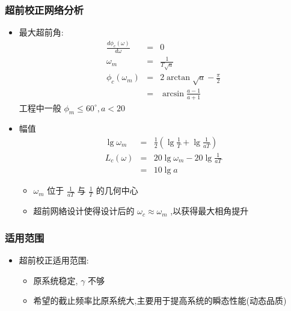 \documentclass[table]{beamer}
\begin{document}
\begin{frame}
\begin{itemize}

\end{itemize} %
\end{frame}
\begin{frame}
\frametitle{超前校正网络分析}
\label{sec-2-1-2}
\begin{itemize}

\item 最大超前角:
\label{sec-2-1-2-1}%
\begin{eqnarray*}
\frac{d\phi_c(\omega)}{d\omega} & = & 0 \\
\omega_m &=& \frac{1}{T\sqrt{a}}\\
\phi_c(\omega_m) &=& 2\arctan\sqrt{a}-\frac{\pi}{2}\\
                 &=& \arcsin\frac{a-1}{a+1}
\end{eqnarray*}
工程中一般 $\phi_m\leq 60^{\circ},a<20$ 

\item 幅值
\label{sec-2-1-2-2}%
\begin{eqnarray*}
\lg\omega_m &=& \frac{1}{2}(\lg\frac{1}{T}+\lg\frac{1}{aT}) \\
L_c(\omega) &=& 20\lg\omega_m-20\lg\frac{1}{aT} \\
            &=& 10\lg a
\end{eqnarray*}
\begin{itemize}
\item <4-> $\omega_m$ 位于 $\frac{1}{aT}$ 与 $\frac{1}{T}$ 的几何中心
\item <5-> 超前网絡设计使得设计后的 $\omega_c\approx\omega_m$ ,以获得最大相角提升
\end{itemize}
\end{itemize} %
\end{frame}
\begin{frame}
\frametitle{适用范围}
\label{sec-2-1-3}

\begin{itemize}
\item 超前校正适用范围:
\begin{itemize}
\item <2->原系统稳定, $\gamma$ 不够
\item <3->希望的截止频率比原系统大,主要用于提高系统的瞬态性能(动态品质)
\end{itemize}
\end{itemize}
\end{frame}
\end{document}
